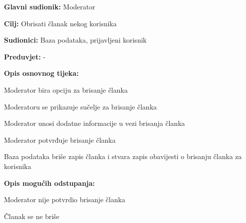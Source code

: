 \noindent {}
\begin{packed_item}

\item \textbf{Glavni sudionik:} Moderator
\item  \textbf{Cilj:} Obrisati članak nekog korisnika
\item  \textbf{Sudionici:} Baza podataka, prijavljeni korisnik
\item  \textbf{Preduvjet:} -
\item  \textbf{Opis osnovnog tijeka:}

\item[] \begin{packed_enum}

    \item Moderator bira opciju za brisanje članka
    \item Moderatoru se prikazuje sučelje za brisanje članka
    \item Moderator unosi dodatne informacije u vezi brisanja članka
    \item Moderator potvrđuje brisanje članka
    \item Baza podataka briše zapis članka i stvara zapis obavijesti o brisanju članka za korisnika

\end{packed_enum}

\item  \textbf{Opis mogućih odstupanja:}

\item[] \begin{packed_item}

    \item[4.a] Moderator nije potvrdio brisanje članka
    \item[] \begin{packed_enum}

        \item Članak se ne briše

    \end{packed_enum}

\end{packed_item}
\end{packed_item}

